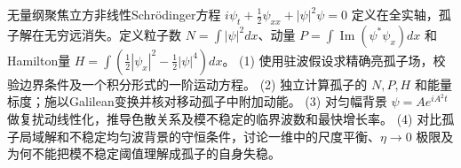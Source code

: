 无量纲聚焦立方非线性Schrödinger方程
\(i\psi_t+\frac12\psi_{xx}+|\psi|^2\psi=0\) 定义在全实轴，孤子解在无穷远消失。定义粒子数 \(N=\int|\psi|^2dx\)、动量 \(P=\int\operatorname{Im}(\psi^*\psi_x)dx\) 和Hamilton量 \(H=\int(\frac12|\psi_x|^2-\frac12|\psi|^4)dx\)。
(1) 使用驻波假设求精确亮孤子场，校验边界条件及一个积分形式的一阶运动方程。
(2) 独立计算孤子的 \(N,P,H\) 和能量标度；施以Galilean变换并核对移动孤子中附加动能。
(3) 对匀幅背景 \(\psi=Ae^{iA^2t}\) 做复扰动线性化，推导色散关系及模不稳定的临界波数和最快增长率。
(4) 对比孤子局域解和不稳定均匀波背景的守恒条件，讨论一维中的尺度平衡、\(\eta\to0\) 极限及为何不能把模不稳定阈值理解成孤子的自身失稳。
